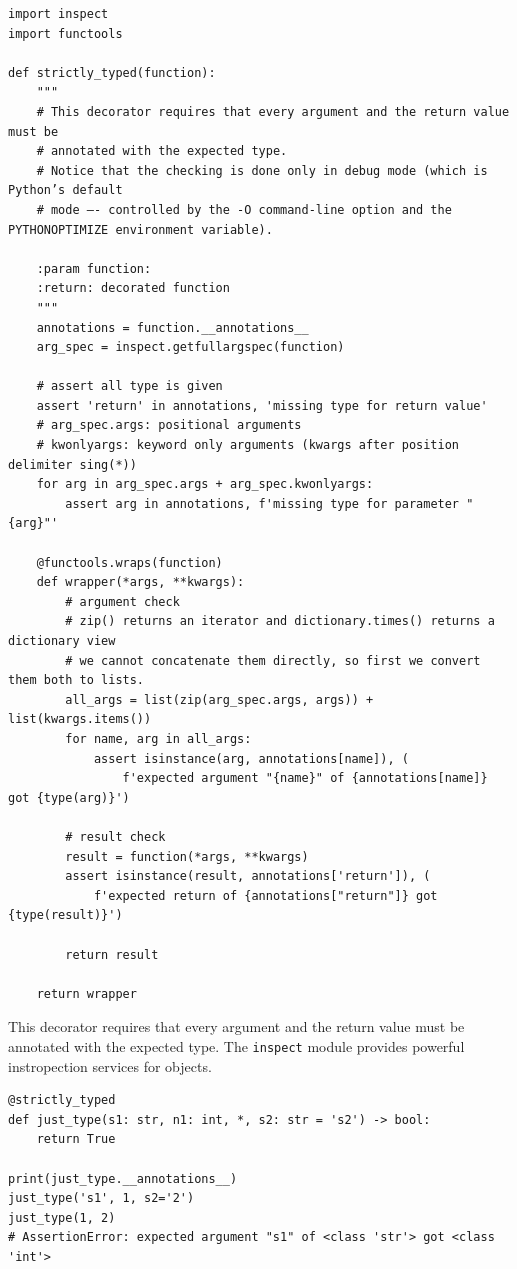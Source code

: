 \begin{lstlisting}
import inspect
import functools

def strictly_typed(function):
    """
    # This decorator requires that every argument and the return value must be
    # annotated with the expected type.
    # Notice that the checking is done only in debug mode (which is Python’s default
    # mode —- controlled by the -O command-line option and the PYTHONOPTIMIZE environment variable).

    :param function:
    :return: decorated function
    """
    annotations = function.__annotations__
    arg_spec = inspect.getfullargspec(function)

    # assert all type is given
    assert 'return' in annotations, 'missing type for return value'
    # arg_spec.args: positional arguments
    # kwonlyargs: keyword only arguments (kwargs after position delimiter sing(*))
    for arg in arg_spec.args + arg_spec.kwonlyargs:
        assert arg in annotations, f'missing type for parameter "{arg}"'

    @functools.wraps(function)
    def wrapper(*args, **kwargs):
        # argument check
        # zip() returns an iterator and dictionary.times() returns a dictionary view
        # we cannot concatenate them directly, so first we convert them both to lists.
        all_args = list(zip(arg_spec.args, args)) + list(kwargs.items())
        for name, arg in all_args:
            assert isinstance(arg, annotations[name]), (
                f'expected argument "{name}" of {annotations[name]} got {type(arg)}')

        # result check
        result = function(*args, **kwargs)
        assert isinstance(result, annotations['return']), (
            f'expected return of {annotations["return"]} got {type(result)}')

        return result

    return wrapper  
\end{lstlisting}


This decorator requires that every argument and the return value must be annotated with the expected type.
The \verb|inspect| module provides powerful instropection services for objects.


\begin{lstlisting}
@strictly_typed
def just_type(s1: str, n1: int, *, s2: str = 's2') -> bool:
    return True  

print(just_type.__annotations__)
just_type('s1', 1, s2='2')
just_type(1, 2)  
# AssertionError: expected argument "s1" of <class 'str'> got <class 'int'>
\end{lstlisting}

